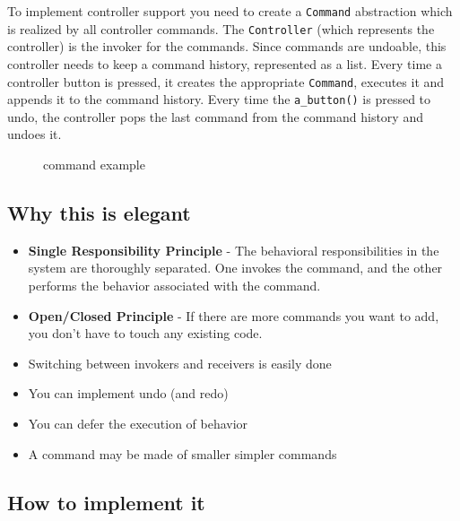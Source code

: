 To implement controller support you need to create a \texttt{Command}
abstraction which is realized by all controller commands. The
\texttt{Controller} (which represents the controller) is the invoker for
the commands. Since commands are undoable, this controller needs to keep
a command history, represented as a list. Every time a controller button
is pressed, it creates the appropriate \texttt{Command}, executes it and
appends it to the command history. Every time the \texttt{a\_button()}
is pressed to undo, the controller pops the last command from the
command history and undoes it.

\begin{figure}
\centering
{}
\caption{command example}
\end{figure}

\subsection{Why this is
elegant}\label{behavioral-patterns.md__why-this-is-elegant-2}

\begin{itemize}
\tightlist
\item
  \textbf{Single Responsibility Principle} - The behavioral
  responsibilities in the system are thoroughly separated. One invokes
  the command, and the other performs the behavior associated with the
  command.
\item
  \textbf{Open/Closed Principle} - If there are more commands you want
  to add, you don't have to touch any existing code.
\item
  Switching between invokers and receivers is easily done
\item
  You can implement undo (and redo)
\item
  You can defer the execution of behavior
\item
  A command may be made of smaller simpler commands
\end{itemize}

\subsection{How to implement
it}\label{behavioral-patterns.md__how-to-implement-it-2}

